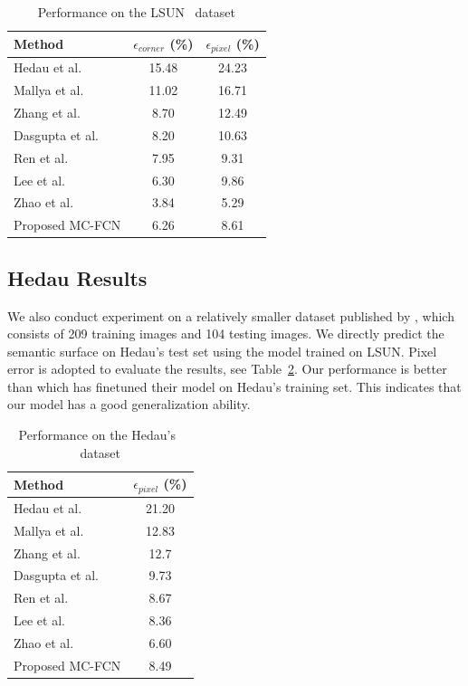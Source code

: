\begin{table}
	\centering 
	\begin{tabular}{lcc}
		\toprule
		Method & $\epsilon_{corner}$ (\%) & $\epsilon_{pixel}$ (\%) \\
		\midrule
		Hedau et al.~\cite{hedau2009recovering} & 15.48 & 24.23 \\
		Mallya et al.~\cite{mallya2015learning} & 11.02 & 16.71 \\
		Zhang et al.~\cite{zhang2017learning} & 8.70 & 12.49 \\
		Dasgupta et al.~\cite{dasgupta2016delay} & 8.20 & 10.63 \\
		Ren et al.~\cite{ren2016three} & 7.95 & 9.31 \\
		Lee et al.~\cite{LeeRoomNet17} & 6.30 & 9.86 \\
		Zhao et al.~\cite{zhao2017physics} & 3.84 & 5.29 \\
		\midrule
		Proposed MC-FCN & 6.26 & 8.61 \\
		\bottomrule
	\end{tabular}
	\caption{Performance on the LSUN~\cite{zhang2015large} dataset}	
	\label{table:comparison-lsun}
\end{table}

\subsection{Hedau Results}
\label{sec:Hedau}
We also conduct experiment on a relatively smaller dataset published by \cite{hedau2009recovering}, which consists of 209 training images and 104 testing images. We directly predict the semantic surface on Hedau's test set using the model trained on LSUN. Pixel error is adopted to evaluate the results, see Table~\ref{table:comparison-hedau}. Our performance is better than \cite{ren2016three} which has finetuned their model on Hedau's training set. This indicates that our model has a good generalization ability.

\begin{table}
	\centering 
	\begin{tabular}{lc}
		\toprule
		Method & $\epsilon_{pixel}$ (\%) \\
		\midrule
		Hedau et al.~\cite{hedau2009recovering} & 21.20 \\
		Mallya et al.~\cite{mallya2015learning} & 12.83 \\
		Zhang et al.~\cite{zhang2017learning} & 12.7 \\
		Dasgupta et al.~\cite{dasgupta2016delay} & 9.73 \\
		Ren et al.~\cite{ren2016coarse} & 8.67 \\
		Lee et al.~\cite{LeeRoomNet17} & 8.36 \\
		Zhao et al.~\cite{zhao2017physics} & 6.60 \\
		\midrule
		Proposed MC-FCN & 8.49 \\
		\bottomrule
	\end{tabular}
	\caption{Performance on the Hedau's~\cite{hedau2009recovering} dataset}
	\label{table:comparison-hedau}
\end{table}



